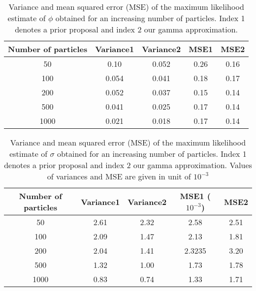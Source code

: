 \documentclass[12pt]{article}
\newcommand{\ra}[1]{\renewcommand{\arraystretch}{#1}}
\begin{document}
	\begin{table}[htb]
		\centering
		\ra{1.3}
		\begin{tabular}{@{}ccccc@{}} \toprule
			Number of particles & Variance1 &  Variance2 & MSE1 & MSE2 \\ \midrule
			50 & 0.10 & 0.052 & 0.26 & 0.16\\
			100 & 0.054 & 0.041 & 0.18 & 0.17\\ 
			200 & 0.052 & 0.037 & 0.15 & 0.14\\ 
			500 & 0.041 & 0.025 & 0.17 & 0.14\\
			1000 & 0.021 & 0.018 & 0.17 & 0.14 \\ \bottomrule
		\end{tabular}
		\caption[Variance and mean squared error of the MLE of $\phi$]{Variance and mean squared error (MSE) of the maximum likelihood estimate of $\phi$ obtained for an increasing number of particles. Index 1 denotes a prior proposal and index 2 our gamma approximation.}
		\label{table:mlePhi}
	\end{table}

	\begin{table}[htb]
		\centering
		\ra{1.3}
		\begin{tabular}{@{}ccccc@{}} \toprule
			Number of particles & Variance1 &  Variance2 & MSE1 ($10^{-3}$)& MSE2\\ \midrule
			50 & 2.61 & 2.32 & 2.58 & 2.51\\
			100 & 2.09 & 1.47 & 2.13 & 1.81\\
			200 & 2.04 & 1.41 &  2.3235  & 3.20\\ 
			500 & 1.32 & 1.00 & 1.73 & 1.78\\
			1000 & 0.83 & 0.74 & 1.33 & 1.71 \\  \bottomrule
		\end{tabular}
		\caption[Variance and mean squared error of the MLE of $\sigma$]{Variance and mean squared error (MSE) of the maximum likelihood estimate of $\sigma$ obtained  for an increasing number of particles. Index 1 denotes a prior proposal and index 2 our gamma approximation. Values of variances and MSE are given in unit of $10^{-3}$}
		\label{table:mleSigma}
	\end{table}
	
\end{document}
